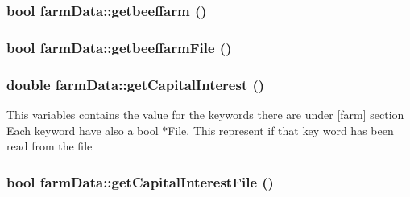 \label{classfarm_data_ad5e87ebf838260c10d07f9ffccd1bfbc}
\hypertarget{classfarm_data_adc3da31ffca5aee7c893d112d8374be8}{
\subsubsection[{getbeeffarm}]{\setlength{\rightskip}{0pt plus 5cm}bool farmData::getbeeffarm ()}}
\label{classfarm_data_adc3da31ffca5aee7c893d112d8374be8}
\hypertarget{classfarm_data_a70fbbca25a9f70237844f15c034c2a11}{
\subsubsection[{getbeeffarmFile}]{\setlength{\rightskip}{0pt plus 5cm}bool farmData::getbeeffarmFile ()}}
\label{classfarm_data_a70fbbca25a9f70237844f15c034c2a11}
\hypertarget{classfarm_data_a639ebaf1060358d4c6b67ba41dfb4929}{
\subsubsection[{getCapitalInterest}]{\setlength{\rightskip}{0pt plus 5cm}double farmData::getCapitalInterest ()}}
\label{classfarm_data_a639ebaf1060358d4c6b67ba41dfb4929}
This variables contains the value for the keywords there are under \mbox{[}farm\mbox{]} section Each keyword have also a bool $\ast$File. This represent if that key word has been read from the file \hypertarget{classfarm_data_a39eea7de86f46c9ca07a358f9e89f933}{
\subsubsection[{getCapitalInterestFile}]{\setlength{\rightskip}{0pt plus 5cm}bool farmData::getCapitalInterestFile ()}}
